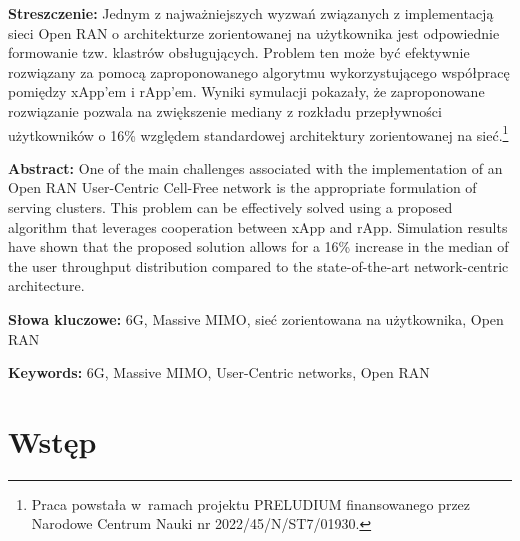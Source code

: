\documentclass[a4paper]{article}
\newcommand{\keywordsPL}[1]{\small\textbf{Słowa kluczowe:} #1}
\newcommand{\keywordsEN}[1]{\small\textbf{Keywords:} #1}
\newcommand{\abstractPL}[1]{\small\textbf{Streszczenie:} #1}
\newcommand{\abstractEN}[1]{\small\textbf{Abstract:} #1}
\begin{document}
\begin{multicols}{2}
\noindent
\abstractPL{
Jednym z najważniejszych wyzwań związanych z implementacją sieci Open RAN o architekturze zorientowanej na użytkownika jest odpowiednie formowanie tzw. klastrów obsługujących. Problem ten może być efektywnie rozwiązany za pomocą zaproponowanego algorytmu wykorzystującego współpracę pomiędzy xApp'em i rApp'em. Wyniki symulacji pokazały, że zaproponowane rozwiązanie pozwala na zwiększenie mediany z rozkładu przepływności użytkowników o 16\% względem standardowej architektury zorientowanej na sieć.\footnote[1]{Praca powstała w~ramach projektu PRELUDIUM finansowanego przez Narodowe Centrum Nauki nr 2022/45/N/ST7/01930.}}
\medskip

\noindent
\abstractEN{
One of the main challenges associated with the implementation of an Open RAN User-Centric Cell-Free network is the appropriate formulation of serving clusters. This problem can be effectively solved using a proposed algorithm that leverages cooperation between xApp and rApp. Simulation results have shown that the proposed solution allows for a 16\% increase in the median of the user throughput distribution compared to the state-of-the-art network-centric architecture.}
\medskip

\noindent
\keywordsPL{6G, Massive MIMO, sieć zorientowana na użytkownika, Open RAN}
\medskip

\noindent
\keywordsEN{6G, Massive MIMO, User-Centric networks, Open RAN}

\section{Wstęp}


\end{multicols}
\end{document}
